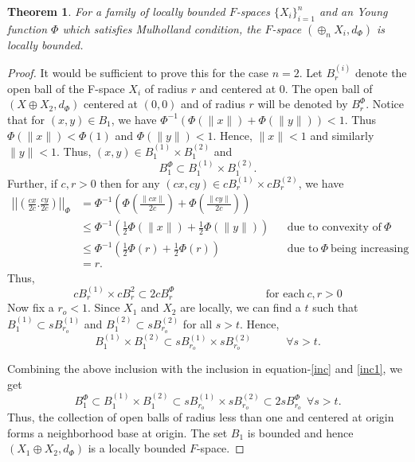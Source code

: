 \documentclass[pdflatex,sn-mathphys-num]{sn-jnl}%
\theoremstyle{thmstyleone}%
\newtheorem{theorem}{Theorem}%
\theoremstyle{thmstyletwo}%
\theoremstyle{thmstylethree}%
\begin{document}
	 \begin{theorem}\label{locb}
	 	For a family of locally bounded $F$-spaces $\{X_i\}_{i=1}^n$ and an Young function $\Phi$ which satisfies Mulholland condition, the $F$-space $\left(\oplus_nX_i,d_\Phi\right)$ is locally bounded.
	 \end{theorem}
	 \begin{proof}
	 	It would be sufficient to prove this for the case $n=2$. Let $B_r^{(i)}$ denote the open ball of the F-space $X_i$ of radius $r$ and centered at $0$.  The open ball of $\left(X\oplus X_2,d_\Phi\right)$ centered at $(0,0)$ and of radius $r$ will be denoted by $B_r^\Phi$. Notice that for $(x,y)\in B_1$, we have 
	 	$\Phi^{-1}\left(\Phi(\|x\|)+\Phi(\|y\|)\right)< 1$. Thus $\Phi(\|x\|)<\Phi(1)$ and $\Phi(\|y\|)<1$. Hence, $\|x\|<1$ and similarly $\|y\|<1$. Thus, $(x,y)\in B_1^{(1)}\times B_1^{(2)}$ and 
	 	\begin{equation}\label{inc}
	 		B_1^\Phi\subset B_1^{(1)}\times B_1^{(2)}.
	 	\end{equation}
	 	Further, if $c,r>0$ then for any $(cx,cy)\in cB_{r}^{(1)}\times cB_{r}^{(2)}$, we have 
	 	\begin{align}
	 		\left|\left|\left(\frac{cx}{2c}.\frac{cy}{2c}\right)\right|\right|_\Phi&=\Phi^{-1}\left(\Phi(\frac{\|cx\|}{2c})+\Phi(\frac{\|cy\|}{2c})\right)\nonumber\\&\leq\Phi^{-1}\left(\frac{1}{2}\Phi(\|x\|)+\frac{1}{2}\Phi(\|y\|)\right)&&\text{due to convexity of}~\Phi\nonumber\\&\leq \Phi^{-1}\left(\frac{1}{2}\Phi(r)+\frac{1}{2}\Phi(r)\right)&&\text{due to}~\Phi~\text{being increasing}\nonumber\\&=r.
	 	\end{align}
	 	Thus, \begin{equation}\label{inc1}
cB_{r}^{(1)}\times cB_{r}^{2}\subset 2cB_r^{\Phi}~~~~~~~~~~~~~~~~~~~~~~~~~~~~~~~~~~~~~\text{for each}~c,r>0
	 	\end{equation}
	 	Now fix a $r_o<1$. Since $X_1$ and $X_2$ are locally, we can find a $t$ such that $B_1^{(1)}\subset sB_{r_o}^{(1)}$ and $B_1^{(2)}\subset sB_{r_o}^{(2)}$ for all $s>t$. Hence, 
	 	\begin{equation}
	 		B_1^{(1)}\times B_1^{(2)}\subset sB_{r_o}^{(1)}\times sB_{r_o}^{(2)}~~~~~~~~~~~~~~\forall s>t.
	 	\end{equation}
	 	
	 	Combining the above inclusion with the inclusion in equation-\ref{inc} and \ref{inc1}, we get 
	 	\begin{equation}
B_1^\Phi\subset	B_1^{(1)}\times B_1^{(2)}\subset sB_{r_o}^{(1)}\times sB_{r_o}^{(2)}\subset 2sB_{r_o}^\Phi~~\forall s>t.
	 	\end{equation}
	 	Thus, the collection of open balls of radius less than one and centered at origin forms a neighborhood base at origin. The set $B_1$ is bounded and hence $\left(X_1\oplus X_2,d_\Phi\right)$ is a locally bounded $F$-space.
	 \end{proof}
\end{document}
